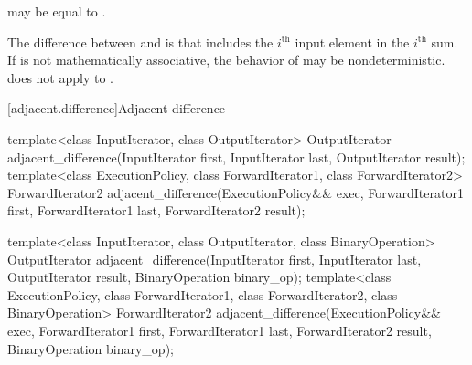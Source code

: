 \begin{itemdescr}
\pnum
\remarks
{} may be equal to .

\pnum
\begin{note}
The difference between  and
 is that 
includes the $i^\text{th}$ input element in the $i^\text{th}$ sum.
If  is not mathematically associative,
the behavior of  may be nondeterministic.
 does not
apply  to .
\end{note}
\end{itemdescr}

[adjacent.difference]{Adjacent difference}

%
\begin{itemdecl}
template<class InputIterator, class OutputIterator>
  OutputIterator
    adjacent_difference(InputIterator first, InputIterator last, OutputIterator result);
template<class ExecutionPolicy, class ForwardIterator1, class ForwardIterator2>
  ForwardIterator2
    adjacent_difference(ExecutionPolicy&& exec,
                        ForwardIterator1 first, ForwardIterator1 last, ForwardIterator2 result);

template<class InputIterator, class OutputIterator, class BinaryOperation>
  OutputIterator
    adjacent_difference(InputIterator first, InputIterator last,
                        OutputIterator result, BinaryOperation binary_op);
template<class ExecutionPolicy, class ForwardIterator1, class ForwardIterator2,
         class BinaryOperation>
  ForwardIterator2
    adjacent_difference(ExecutionPolicy&& exec,
                        ForwardIterator1 first, ForwardIterator1 last,
                        ForwardIterator2 result, BinaryOperation binary_op);
\end{itemdecl}

